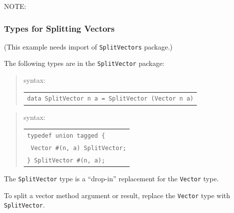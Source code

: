 NOTE: \hfill {}


\subsubsection{Types for Splitting Vectors}

\label{sec:splitports_vector_types}

{\footnotesize (This example needs import of {\tt SplitVectors} package.)}

The following types are in the {\tt SplitVector} package:


\begin{quote}
  {\BHb} syntax:
  \hspace*{2em}\begin{tabular}[t]{l}
    {\tt data SplitVector n a = SplitVector (Vector n a)}
  \end{tabular}
\end{quote}

\begin{quote}
  {\BSVb} syntax:
  \hspace*{2em}\begin{tabular}[t]{l}
    {\tt typedef union tagged \{} \\
    {\tt \hspace*{2em}  Vector \#(n, a) SplitVector;} \\
    {\tt \} SplitVector \#(n, a);}
  \end{tabular}
\end{quote}

The {\tt SplitVector} type is a ``drop-in'' replacement for the {\tt Vector} type.

To split a vector method argument or result, replace the {\tt Vector}
type with {\tt SplitVector}.


